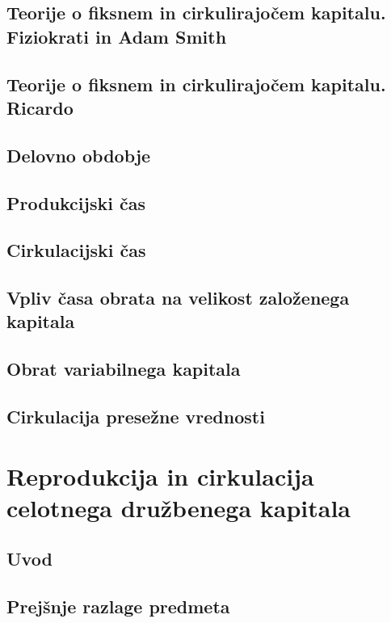 \documentclass[egregdoesnotlikesansseriftitles, a5paper, DIV=calc]{scrbook}
\begin{document}
    \chapter{Teorije o fiksnem in cirkulirajočem kapitalu. Fiziokrati in Adam Smith}

    \chapter{Teorije o fiksnem in cirkulirajočem kapitalu. Ricardo}

    \chapter{Delovno obdobje}

    \chapter{Produkcijski čas}

    \chapter{Cirkulacijski čas}

    \chapter{Vpliv časa obrata na velikost založenega kapitala}

    \chapter{Obrat variabilnega kapitala}

    \chapter{Cirkulacija presežne vrednosti}

\part{Reprodukcija in cirkulacija celotnega družbenega kapitala}

\chapter{Uvod}

    \chapter{Prejšnje razlage predmeta}
\end{document}
